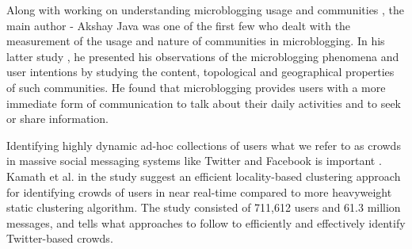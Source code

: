 \documentclass{sig-alternate}
\begin{document}
Along with working on understanding microblogging usage and communities
\cite{Java:2007}, the main author - Akshay Java was one of the first few who
dealt with the measurement of the usage and nature of communities in
microblogging. In his latter study \cite{Java:2008}, he presented his
observations of the microblogging phenomena and user intentions by studying the
content, topological and geographical properties of such communities. He found
that microblogging provides users with a more immediate form of communication
to talk about their daily activities and to seek or share information.



Identifying highly dynamic ad-hoc collections of users what we refer to as
crowds in massive social messaging systems like Twitter and Facebook is
important \cite{krishna:2010}. Kamath et al. in the study suggest an
efficient locality-based clustering approach for identifying crowds of users in
near real-time compared to more heavyweight static clustering algorithm. The
study consisted of 711,612 users and 61.3 million messages, and tells what
approaches to follow to efficiently and effectively identify Twitter-based
crowds.
\end{document}
